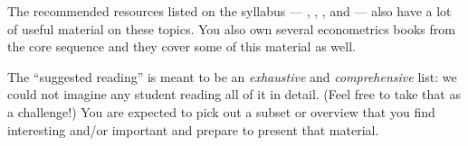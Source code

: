 \documentclass[nofonts,nols]{tufte-handout}
\begin{document}
\begin{fullwidth}
\noindent%
The recommended resources listed on the syllabus --- \citep{Lu06},
\citep{Ca07}, \citep{MS08}, and \citep{SW08} --- also have a lot of
useful material on these topics. You also own several econometrics
books from the core sequence and they cover some of this material as
well.

The ``suggested reading'' is meant to be an \emph{exhaustive} and
\emph{comprehensive} list: we could not imagine any student reading
all of it in detail. (Feel free to take that as a challenge!) You are
expected to pick out a subset or overview that you find interesting
and/or important and prepare to present that material.



\end{fullwidth}
\end{document}
